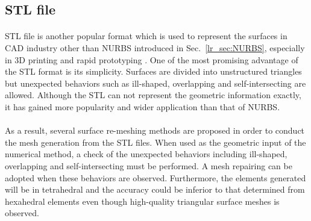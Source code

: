 \subsection{STL file}
\label{lr_sec:stl}
\paragraph{}
STL file is another popular format which is used to represent the surfaces in CAD industry other than NURBS introduced in Sec.~\ref{lr_sec:NURBS}, especially in 3D printing and rapid prototyping \citep{Rengier2010,doi:10.1080/10426910902997571}.
One of the most promising advantage of the STL format is its simplicity.
Surfaces are divided into unstructured triangles but unexpected behaviors such as ill-shaped, overlapping and self-intersecting are allowed.
Although the STL can not represent the geometric information exactly, it has gained more popularity and wider application than that of NURBS.

\paragraph{}
As a result, several surface re-meshing methods \citep{BECHET20021,Wang2007227} are proposed in order to conduct the mesh generation from the STL files.
When used as the geometric input of the numerical method, a check of the unexpected behaviors including ill-shaped, overlapping and self-intersecting must be performed.
A mesh repairing \citep{Attene:2013:PMR:2431211.2431214} can be adopted when these behaviors are observed.
Furthermore, the elements generated will be in tetrahedral and the accuracy could be inferior to that determined from hexahedral elements even though high-quality triangular surface meshes is observed.
